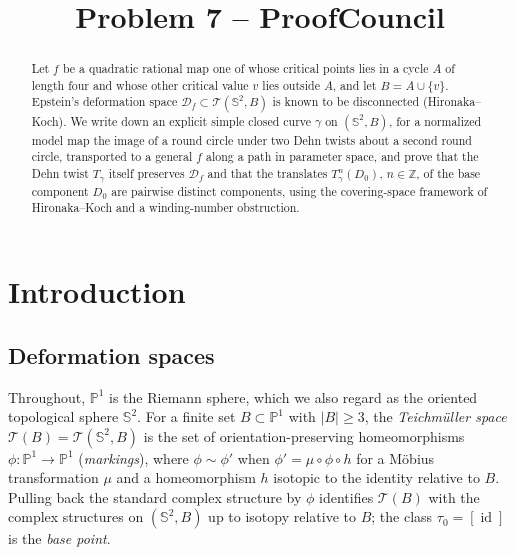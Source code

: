 \documentclass[12pt]{article}
\title{Problem 7 -- ProofCouncil}
\author{}
\date{}
\newcommand{\Pone}{\mathbb P^1}
\newcommand{\Sph}{\mathbb S^2}
\newcommand{\Z}{\mathbb Z}
\newcommand{\Teich}{\mathcal T}
\newcommand{\D}{\mathcal D}
\newcommand{\id}{\operatorname{id}}
\theoremstyle{remark}
\numberwithin{equation}{section}
\begin{document}
\maketitle

\begin{abstract}
Let $f$ be a quadratic rational map one of whose critical points lies in a
cycle $A$ of length four and whose other critical value $v$ lies outside
$A$, and let $B=A\cup\{v\}$. Epstein's deformation space $\D_f\subset\Teich(\Sph,B)$ is
known to be disconnected (Hironaka--Koch). We write down an explicit simple
closed curve $\gamma$ on $(\Sph,B)$, for a normalized model map the image
of a round circle under two Dehn twists about a second round circle,
transported to a general $f$ along a path in parameter space, and prove
that the Dehn twist $T_\gamma$ itself preserves $\D_f$ and that the
translates $T_\gamma^n(D_0)$, $n\in\Z$, of the base component $D_0$ are
pairwise distinct components, using the covering-space framework of
Hironaka--Koch and a winding-number obstruction.
\end{abstract}

\section{Introduction}

\subsection{Deformation spaces}\label{sec:defspaces}

Throughout, $\Pone$ is the Riemann sphere, which we also regard as the
oriented topological sphere $\Sph$. For a finite set $B\subset\Pone$ with
$|B|\ge3$, the \emph{Teichm\"uller space} $\Teich(B)=\Teich(\Sph,B)$ is the
set of orientation-preserving homeomorphisms $\phi\colon\Pone\to\Pone$
(\emph{markings}), where $\phi\sim\phi'$ when $\phi'=\mu\circ\phi\circ h$
for a M\"obius transformation $\mu$ and a homeomorphism $h$ isotopic to the
identity relative to $B$. Pulling back the standard complex structure by
$\phi$ identifies $\Teich(B)$ with the complex structures on $(\Sph,B)$ up
to isotopy relative to $B$; the class $\tau_0=[\id]$ is the \emph{base
point}.
\end{document}
